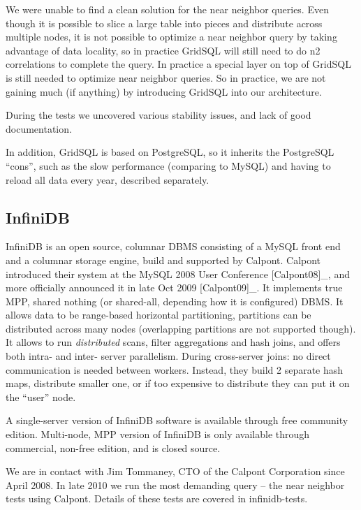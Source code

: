 \documentclass[DM,lsstdraft,toc]{lsstdoc}
\begin{document}
We were unable to find a clean solution for the near neighbor queries.
Even though it is possible to slice a large table into pieces and
distribute across multiple nodes, it is not possible to optimize a near
neighbor query by taking advantage of data locality, so in practice
GridSQL will still need to do n2 correlations to complete the query. In
practice a special layer on top of GridSQL is still needed to optimize
near neighbor queries. So in practice, we are not gaining much (if
anything) by introducing GridSQL into our architecture.

During the tests we uncovered various stability issues, and lack of good
documentation.

In addition, GridSQL is based on PostgreSQL, so it inherits the
PostgreSQL ``cons'', such as the slow performance (comparing to MySQL)
and having to reload all data every year, described separately.

\subsection{InfiniDB}\label{infinidb}

InfiniDB is an open source, columnar DBMS consisting of a MySQL front
end and a columnar storage engine, build and supported by Calpont.
Calpont introduced their system at the MySQL 2008 User Conference
{[}Calpont08{]}\_, and more officially announced it in late Oct 2009
{[}Calpont09{]}\_. It implements true MPP, shared nothing (or
shared-all, depending how it is configured) DBMS. It allows data to be
range-based horizontal partitioning, partitions can be distributed
across many nodes (overlapping partitions are not supported though). It
allows to run \emph{distributed} scans, filter aggregations and hash
joins, and offers both intra- and inter- server parallelism. During
cross-server joins: no direct communication is needed between workers.
Instead, they build 2 separate hash maps, distribute smaller one, or if
too expensive to distribute they can put it on the ``user'' node.

A single-server version of InfiniDB software is available through free
community edition. Multi-node, MPP version of InfiniDB is only available
through commercial, non-free edition, and is closed source.

We are in contact with Jim Tommaney, CTO of the Calpont Corporation
since April 2008. In late 2010 we run the most demanding query -- the
near neighbor tests using Calpont. Details of these tests are covered in
infinidb-tests.
\end{document}
